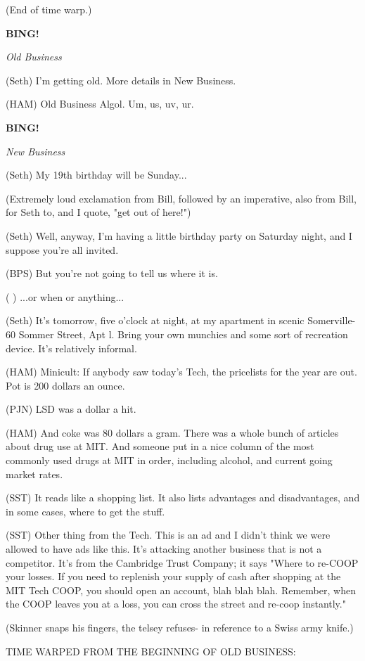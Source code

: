 \documentclass[12pt]{article}
\newcommand{\bing}{{\bf BING!} }
\newcommand{\goto}[1]{\bing \vskip 12pt \centerline{{\em{#1}}}}
\begin{document}
(End of time warp.)

\goto{Old Business}

(Seth) I'm getting old. More details in New Business.

(HAM) Old Business Algol. Um, us, uv, ur.

\goto{New Business}

(Seth) My 19th birthday will be Sunday...

(Extremely loud exclamation from Bill, followed by an imperative, also from Bill, for Seth to,
and I quote, "get out of here!")

(Seth) Well, anyway, I'm having a little birthday party on Saturday night, and I suppose you're
all invited.

(BPS) But you're not going to tell us where it is.

( ) ...or when or anything...

(Seth) It's tomorrow, five o'clock at night, at my apartment in scenic Somerville- 60 Sommer Street, Apt l. Bring your own munchies and some sort of recreation device. It's relatively informal.

(HAM) Minicult: If anybody saw today's Tech, the pricelists for the year are out. Pot is 200 dollars an ounce.

(PJN) LSD was a dollar a hit.

(HAM) And coke was 80 dollars a gram. There was a whole bunch of articles about drug use at MIT. And someone put in a nice column of the most commonly used drugs at MIT in order, including alcohol, and current going market rates.

(SST) It reads like a shopping list. It also lists advantages and disadvantages, and in some cases, where to get the stuff.

(SST) Other thing from the Tech. This is an ad and I didn't think we were allowed to have ads like this. It's attacking another business that is not a competitor. It's from the Cambridge Trust Company; it says "Where to re-COOP your losses. If you need to replenish your supply of cash after shopping at the MIT Tech COOP, you should open an account, blah blah blah. Remember, when the COOP leaves you at a loss, you can cross the street and re-coop instantly."

(Skinner snaps his fingers, the telsey refuses- in reference to a Swiss army knife.)

TIME WARPED FROM THE BEGINNING OF OLD BUSINESS:
\end{document}
